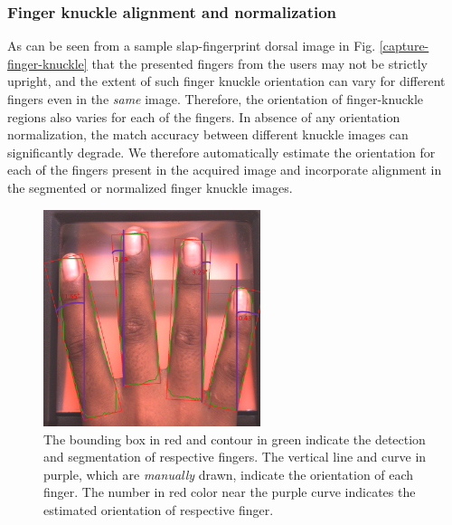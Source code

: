 \subsubsection{Finger knuckle alignment and normalization\label{fk-alignment}}

As can be seen from a sample slap-fingerprint dorsal image in Fig. \ref{capture-finger-knuckle} that the presented fingers from the users may not be strictly upright, and the extent of such finger knuckle orientation can vary for different fingers even in the \textit{same} image. Therefore, the orientation of finger-knuckle regions also varies for each of the fingers. In absence of any orientation normalization, the match accuracy between different knuckle images can significantly degrade. We therefore automatically estimate the orientation for each of the fingers present in the acquired image and incorporate alignment in the segmented or normalized finger knuckle images.

\begin{figure}[ht]
    \centering
    \includegraphics[width=2.5in]{Figures/finger-orientation.png}
    \caption{The bounding box in red and contour in green indicate the detection and segmentation of respective fingers. The vertical line and curve in purple, which are \textit{manually} drawn, indicate the orientation of each finger. The number in red color near the purple curve indicates the estimated orientation of respective finger.}
    \label{finger-orientation}
\end{figure}

